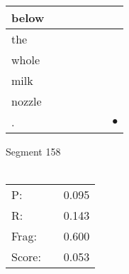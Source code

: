 \documentclass[landscape]{article}
\newcommand{\ssp}{\hspace{2pt}}
\newcommand{\mex}{\cellcolor{g}$\bullet$}
\begin{document}
\begin{tabular}{|l|p{10pt}|p{10pt}|p{10pt}|p{10pt}|p{10pt}|p{10pt}|}
\hline
\ssp below \ssp&\hspace{2pt}&\hspace{2pt}&\hspace{2pt}&\hspace{2pt}&\hspace{2pt}&\hspace{2pt}\\
\hline
\ssp the \ssp&\hspace{2pt}&\hspace{2pt}&\hspace{2pt}&\hspace{2pt}&\hspace{2pt}&\hspace{2pt}\\
\hline
\ssp whole \ssp&\hspace{2pt}&\hspace{2pt}&\hspace{2pt}&\hspace{2pt}&\hspace{2pt}&\hspace{2pt}\\
\hline
\ssp milk \ssp&\hspace{2pt}&\hspace{2pt}&\hspace{2pt}&\hspace{2pt}&\hspace{2pt}&\hspace{2pt}\\
\hline
\ssp nozzle \ssp&\hspace{2pt}&\hspace{2pt}&\hspace{2pt}&\hspace{2pt}&\hspace{2pt}&\hspace{2pt}\\
\hline
\ssp \cellcolor{ref5}. \ssp&\hspace{2pt}&\hspace{2pt}&\hspace{2pt}&\hspace{2pt}&\hspace{2pt}&\hspace{2pt}\mex\\
\hline
\end{tabular}

\vspace{6pt}
\noindent Segment 158\\\\
\noindent\begin{tabular}{lm{12pt}r}
\hline
P:&&0.095\\
R:&&0.143\\
Frag:&&0.600\\
Score:&&0.053\\
\end{tabular}
\end{document}
